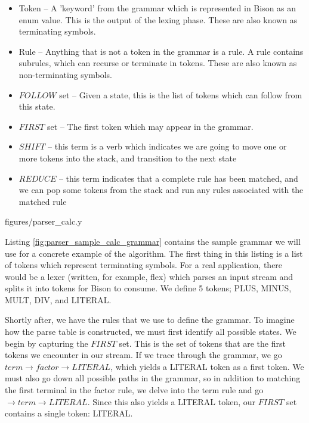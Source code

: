 \documentclass[]{article}
\begin{document}
\begin{itemize}
	\item Token -- A 'keyword' from the grammar which is represented in Bison as an enum value. This is the output of the lexing phase. These are also known as terminating symbols.
	\item Rule -- Anything that is not a token in the grammar is a rule. A rule contains subrules, which can recurse or terminate in tokens. These are also known as non-terminating symbols.
	\item $FOLLOW$ set -- Given a state, this is the list of tokens which can follow from this state.
	\item $FIRST$ set -- The first token which may appear in the grammar.
	\item $SHIFT$ -- this term is a verb which indicates we are going to move one or more tokens into the stack, and transition to the next state
	\item $REDUCE$ -- this term indicates that a complete rule has been matched, and we can pop some tokens from the stack and run any rules associated with the matched rule
\end{itemize}


{figures/parser_calc.y}

Listing \ref{fig:parser_sample_calc_grammar} contains the sample grammar we will use for a concrete example of the algorithm.
The first thing in this listing is a list of tokens which represent terminating symbols.
For a real application, there would be a lexer (written, for example, flex) which parses an input stream and splits it into tokens for Bison to consume.
We define 5 tokens; PLUS, MINUS, MULT, DIV, and LITERAL.

Shortly after, we have the rules that we use to define the grammar.
To imagine how the parse table is constructed, we must first identify all possible states.
We begin by capturing the $FIRST$ set.
This is the set of tokens that are the first tokens we encounter in our stream.
If we trace through the grammar, we go $term \rightarrow factor \rightarrow LITERAL$, which yields a LITERAL token as a first token.
We must also go down all possible paths in the grammar, so in addition to matching the first terminal in the factor rule, we delve into the term rule and go $\rightarrow term \rightarrow LITERAL$.
Since this also yields a LITERAL token, our $FIRST$ set contains a single token: LITERAL.
\end{document}
